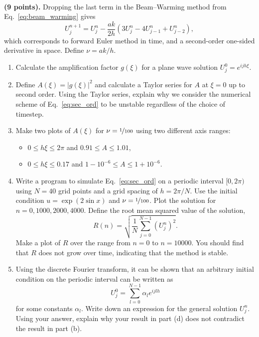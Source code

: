 \documentclass[11pt]{article}
\begin{document}
\begin{problem} \\ 
    \textbf{(9 points).}
        Dropping the last term in the Beam--Warming method from Eq.~\eqref{eq:beam_warming}
        gives
        \begin{equation}
          U^{n+1}_j = U^n_j - \frac{ak}{2h} (3 U^n_j - 4U^n_{j-1} + U^n_{j-2} ), \label{eq:sec_ord}
        \end{equation}
        which corresponds to forward Euler method in time, and a second-order
        one-sided derivative in space. Define $\nu = ak/h$.
        \begin{enumerate}
          \item Calculate the amplification factor $g(\xi)$ for a plane wave solution
                $U^0_j = e^{ijh\xi}$.
          \item Define $A(\xi)= |g(\xi)|^2$ and calculate a Taylor series for $A$ at
                $\xi=0$ up to second order. Using the Taylor series, explain why we
                consider the numerical scheme of Eq.~\eqref{eq:sec_ord} to be unstable
                regardless of the choice of timestep.
          \item Make two plots of $A(\xi)$ for $\nu = \nicefrac1{100}$ using two different
                axis ranges:
                \begin{itemize}
                  \item $0\le h\xi \le 2\pi$ and $0.91 \le A \le 1.01$,
                  \item $0\le h\xi \le 0.17$ and $1-10^{-6} \le A \le 1+10^{-6}$.
                \end{itemize}
          \item Write a program to simulate Eq.~\eqref{eq:sec_ord} on a periodic interval $[0,2\pi)$ using $N=40$ grid points
                and a grid spacing of $h = 2\pi/N$. Use the initial condition $u= \exp (2\sin x)$
                and $\nu =\nicefrac1{100}$. Plot the solution for $n=0,1000,2000,4000$. Define
                the root mean squared value of the solution,
                \begin{equation}
                  R(n) = \sqrt{\frac{1}{N} \sum_{j=0}^{N-1} (U^n_j)^2}.
                \end{equation}
                Make a plot of $R$ over the range from $n=0$ to $n=10000$. You should find that $R$
                does not grow over time, indicating that the method is stable.
          \item Using the discrete Fourier transform, it can be shown that an arbitrary initial
                condition on the periodic interval can be written as
                \begin{equation}
                  U^0_j = \sum_{l=0}^{N-1} \alpha_l e^{ijlh}
                \end{equation}
                for some constants $\alpha_l$. Write down an expression for the general
                solution $U^n_j$. Using your answer, explain why your result in part (d)
                does not contradict the result in part (b).
        \end{enumerate}
\end{problem}
\end{document}
